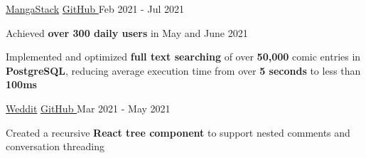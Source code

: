 
\begin{cventries}
  \cventry
    {\fontsize{10pt}{1em}\bodyfont\upshape{}} %
    {\href{https://mangastack.netlify.app/}{MangaStack}} %
    {\href{https://github.com/tacticaltofu/mangastack}{GitHub \faExternalLink}} %
    {Feb 2021 - Jul 2021} %
    {
      \begin{cvitems} %
        \item {Achieved \textbf{over 300 daily users} in May and June 2021}
        \item {Implemented and optimized \textbf{full text searching} of over \textbf{50,000} comic entries in \textbf{PostgreSQL}, reducing average execution time from over \textbf{5 seconds} to less than \textbf{100ms}}
      \end{cvitems}
    }
    
  \cventry
    {\fontsize{10pt}{1em}\bodyfont\upshape{}} %
    {\href{https://weddit.netlify.app/}{Weddit}} %
    {\href{https://github.com/tacticaltofu/reddit-clone}{GitHub \faExternalLink}} %
    {Mar 2021 - May 2021} %
    {
      \begin{cvitems} %
        \item {Created a recursive \textbf{React tree component} to support nested comments and conversation threading}
      \end{cvitems}
    }
\end{cventries}